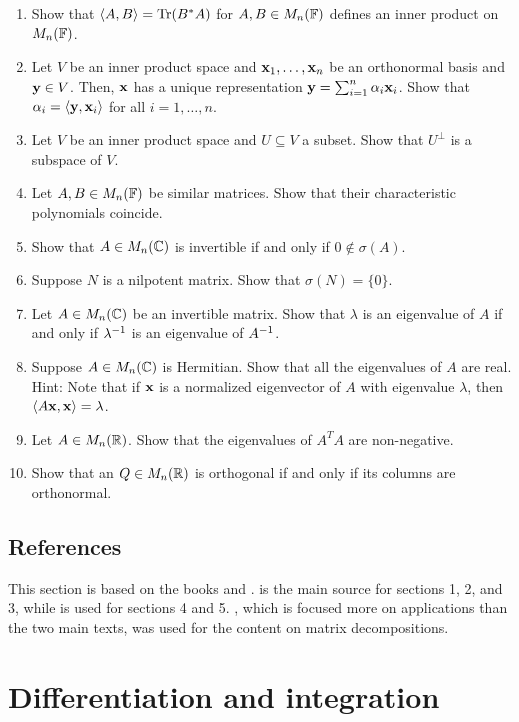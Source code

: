 \documentclass{article}
\begin{document}
\begin{enumerate}
    \item Show that $\langle A,B \rangle = \mathrm{Tr}(B^*A)$ for $A,B \in M_n({\mathbb{F}})$ defines an inner product on $M_n({\mathbb{F}})$.
    \item Let $V$ be an inner product space and ${\mathbf{x}}_1,\ldots, {\mathbf{x}}_n$ be an orthonormal basis and ${\mathbf{y}} \in V$. Then, ${\mathbf{x}}$ has a unique representation ${\mathbf{y}} =\sum_{i=1}^n \alpha_i {\mathbf{x}}_i$. Show that $\alpha_i = \langle {\mathbf{y}},{\mathbf{x}}_i \rangle$ for all $i= 1,\ldots, n$.
    \item Let $V$ be an inner product space and $U\subseteq V$ a subset. Show that $U^\perp$ is a subspace of $V$.
       \item Let $A,B \in M_n({\mathbb{F}})$ be similar matrices. Show that their characteristic polynomials coincide.
    \item Show that $A\in M_n({\mathbb{C}})$ is invertible if and only if $0 \not \in \sigma(A)$.
    \item Suppose $N$ is a nilpotent matrix. Show that $\sigma(N) = \{0\}$.
    \item Let $A\in M_n({\mathbb{C}})$ be an invertible matrix. Show that $\lambda$ is an eigenvalue of $A$ if and only if $\lambda^{-1}$ is an eigenvalue of $A^{-1}$.
    \item Suppose $A\in M_n({\mathbb{C}})$ is Hermitian. Show that all the eigenvalues of $A$ are real. Hint: Note that if ${\mathbf{x}}$ is a normalized eigenvector of $A$ with eigenvalue $\lambda$, then $\langle A{\mathbf{x}},{\mathbf{x}} \rangle = \lambda$.
    \item Let $A\in M_n({\mathbb{R}})$. Show that the eigenvalues of $A^TA$ are non-negative.
\item Show that an $Q\in M_n({\mathbb{R}})$ is orthogonal if and only if its columns are orthonormal.
\end{enumerate}


\subsection{References}
This section is based on the books \cite{linalgright} and \cite{linalgwrong}. \cite{linalgright} is the main source for sections 1, 2, and 3, while \cite{linalgwrong} is used for sections 4 and 5. \cite{ElementaryRealAnalysis}, which is focused more on applications than the two main texts, was used for the content on matrix decompositions. 

\section{Differentiation and integration}
\end{document}
